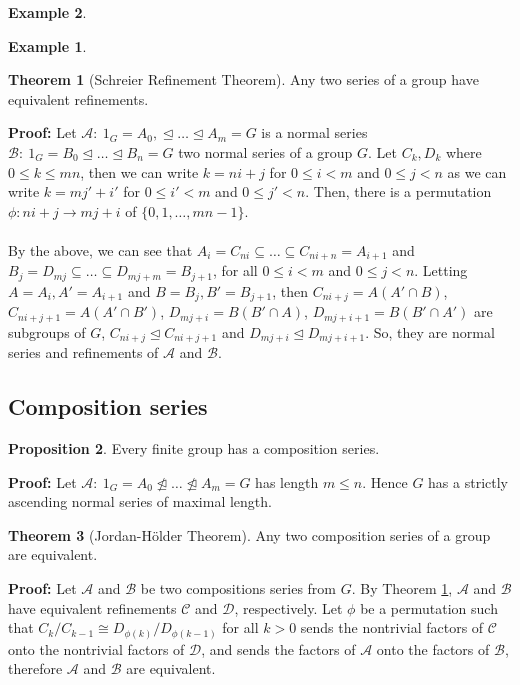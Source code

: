 \documentclass[11pt]{amsbook}%
\theoremstyle{plain}
\theoremstyle{definition}
\newtheorem*{example*}{Example}
\newtheorem{proposition}[theorem]{Proposition}
\newtheorem{theorem}{Theorem}
\numberwithin{equation}{section}
\newcommand{\CK}{\mathcal C}
\newcommand{\AK}{\mathcal A}
\newcommand{\BK}{\mathcal B}
\newcommand{\DK}{\mathcal D}
\renewcommand{\proof}{ \textbf{Proof: }}
\newcommand{\leftnormal}{\trianglelefteq}
\newcommand{\nleftnormal}{\ntrianglelefteq}
\begin{document}
\begin{example*}
\begin{example*}
\begin{theorem}[Schreier Refinement Theorem]
  \label{theo-refinement}
  Any two series of a group have equivalent refinements.
\end{theorem} \vspace{1.8em}
\proof Let $\mathcal{A}: \  1_{G} = A_{0}, \leftnormal \dots \leftnormal A_{m} = G$
  is a normal series $\mathcal{B}: \ 1_{G} = B_{0} \leftnormal \dots \leftnormal B_{n} = G$
  two normal series of a group $G$. Let $C_{k}, D_{k}$ where $0 \leq k \leq mn$,
  then we can write $k = ni + j$ for $0 \leq i < m$ and $0 \leq j < n$ as
  we can write $k = mj' + i'$ for $0 \leq i' < m$ and $0 \leq j' < n$.
  Then, there is a permutation $\phi: ni+j \longrightarrow mj+i$ of $\{0, 1, \dots, mn-1\}$. \\ \\
  By the above, we can see that $A_{i} = C_{ni} \subseteq \dots \subseteq C_{ni+n} = A_{i+1}$
  and $B_{j} = D_{mj} \subseteq \dots \subseteq D_{mj+m} = B_{j+1}$, for all $0 \leq i < m$ and
  $0 \leq j < n$. Letting $A = A_{i}, A' = A_{i+1}$ and $B = B_{j}, B' = B_{j+1}$, then
  $C_{ni+j} = A(A' \cap B)$, $C_{ni+j+1} = A(A' \cap B')$, $D_{mj+i} = B(B' \cap A)$, $D_{mj+i+1} = B(B' \cap A')$
  are subgroups of $G$, $C_{ni+j} \leftnormal C_{ni+j+1}$ and $D_{mj+i} \leftnormal D_{mj+i+1}$.
  So, they are normal series and refinements of $\mathcal{A}$ and $\mathcal{B}$. \qedsymbol

\subsection{Composition series}
\begin{proposition}
  \label{prop-finite-group}
  Every finite group has a composition series.
\end{proposition} \vspace{1.8em}
\proof Let $\mathcal{A}: \ 1_{G} = A_{0} \nleftnormal \dots \nleftnormal A_{m} = G$ has length
$m \leq n$. Hence $G$ has a strictly ascending normal series of maximal length. \qedsymbol

\begin{theorem}[Jordan-H{\"o}lder Theorem]
  Any two composition series of a group are equivalent.
\end{theorem} \vspace{1.8em}
\proof Let $\AK$ and $\BK$ be two compositions series from $G$. By Theorem \ref{theo-refinement},
$\AK$ and $\BK$ have equivalent refinements $\CK$ and $\DK$, respectively. Let $\phi$ be
a permutation such that $C_{k}/C_{k-1} \cong D_{\phi(k)}/D_{\phi(k-1)}$ for all $k > 0$ sends
the nontrivial factors of $\CK$ onto the nontrivial factors of $\DK$, and sends the
factors of $\AK$ onto the factors of $\BK$, therefore $\AK$ and $\BK$ are equivalent. \qedsymbol


\end{example*}
\end{example*}
\end{document}
